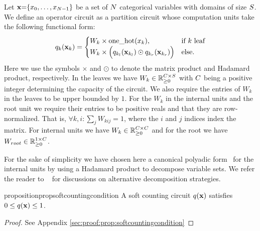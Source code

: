 \begin{definition}
	\label{def:lpc}
	Let   $\mathbf{x}{=}\{x_0,\dots ,x_{N{-}1}  \}$ be a set of $N$ categorical variables with domains of size $S$.
	We define an operator circuit as a partition circuit whose computation units take the following functional form:
	\begin{align}
		{\ensuremath{q}}_k(\mathbf{x}_k)=
		\begin{cases}
			W_k \times  \text{one\_hot}(x_k),
			 & \text{if $k$ leaf}
			\\
			W_k \times \Bigl( q_{k_l}(\mathbf{x}_{k_l}) \odot  q_{k_r} (\mathbf{x}_{k_r}) \Bigr)
			 & \text{else}.
		\end{cases}
		\nonumber
	\end{align}
	Here we use the symbols $\times$ and $\odot$ to denote the matrix product and Hadamard product, respectively.
	In the leaves we have $W_k\in \mathbb{R}_{\geq 0}^{C \times S}$ with $C$ being a positive integer determining the capacity of the circuit. We also require the entries of $W_k$ in the leaves to be upper bounded by $1$.
	For the $W_k$ in the internal units and the root unit we require their entries to be positive reals and that they are row-normalized. That is, $\forall k,i: \sum_j W_{kij}=1$, where the $i$ and $j$ indices index the matrix. For internal units we have $W_k\in \mathbb{R}_{\geq 0}^{C \times C}$ and for the root we have $W_{root} \in \mathbb{R}_{\geq 0}^{1 \times C}$.
\end{definition}


For the sake of simplicity we have chosen here a canonical polyadic form~\citep{carroll1970analysis} for the internal units by using a Hadamard product to decompose variable sets. We refer the reader to ~\citep{loconte2024relationship} for discussions on alternative decomposition strategies.





\begin{restatable}{proposition}{propsoftcountingcondition}
	\label{prop:softcountingcondition}
	A soft counting circuit $q(\mathbf{x})$ satisfies $0 \leq q(\mathbf{x}) \leq 1$.
\end{restatable}

\begin{proof}
	See Appendix \ref{sec:proof:prop:softcountingcondition}
\end{proof}








